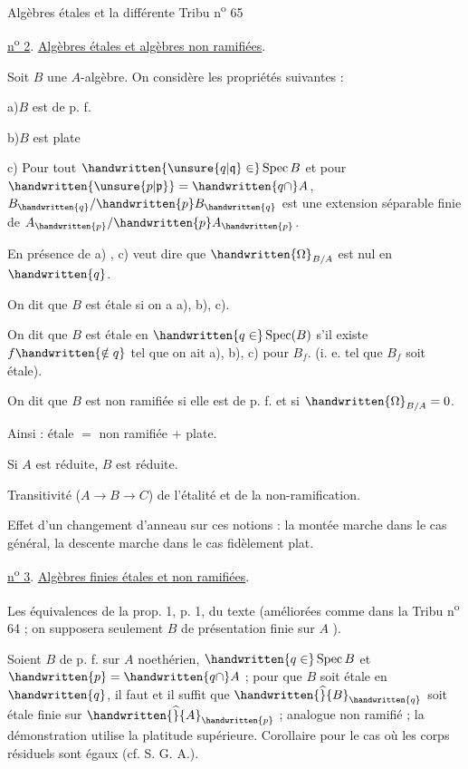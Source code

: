 Algèbres étales et la différente \hfill Tribu n\textsuperscript{o} 65

\uline{n\textsuperscript{o} 2}. \uline{Algèbres étales et algèbres non ramifiées}.

Soit $B$ une $A$-algèbre. On considère les propriétés suivantes :

a)\quad $B$ est de p. f.

b)\quad $B$ est plate

c) Pour tout $\handwritten{\unsure{q|\mathfrak{q}}\in}\operatorname{Spec} B$ et pour $\handwritten{\unsure{p|\mathfrak{p}}}= \handwritten{q\cap}A$, $B_{\handwritten{q}}/\handwritten{p}B_{\handwritten{q}}$ est une extension
séparable finie de $A_{\handwritten{p}}/\handwritten{p}A_{\handwritten{p}}$.

En présence de a) , c) veut dire que $\handwritten{\Omega}_{B/A}$ est nul en $\handwritten{q}$.

On dit que $B$ est étale si on a a), b), c).

On dit que $B$ est étale en $\handwritten{q\in}\operatorname{Spec}(B)$ s'il existe $f\handwritten{\notin q}$ tel que on ait a),
b), c) pour $B_f$. (i. e. tel que $B_f$ soit étale).

On dit que $B$ est non ramifiée si elle est de p. f. et si $\handwritten{\Omega}_{B/A}=0$.

Ainsi : étale $=$ non ramifiée $+$ plate.

Si $A$ est réduite, $B$ est réduite.

Transitivité ($A\longrightarrow B\longrightarrow C$) de l'étalité et de la non-ramification.

Effet d'un changement d'anneau sur ces notions : la montée marche dans le cas
général, la descente marche dans le cas fidèlement plat.

\uline{n\textsuperscript{o} 3}. \uline{Algèbres finies étales et non ramifiées}.

Les équivalences de la prop. 1, p. 1, du texte (améliorées comme dans la Tribu
n\textsuperscript{o} 64 ; on supposera seulement $B$ de présentation finie sur $A$ ).

Soient $B$ de p. f. sur $A$ noethérien, $\handwritten{q\in}\operatorname{Spec} B$ et $\handwritten{p}=\handwritten{q\cap} A$ ; pour
que $B$ soit étale en $\handwritten{q}$, il faut et il suffit que $\handwritten{\widehat}{B}_{\handwritten{q}}$ soit étale finie sur
$\handwritten{\widehat}{A}_{\handwritten{p}}$ ; analogue non ramifié ; la démonstration utilise la platitude supérieure. Corollaire pour le cas où les corps résiduels sont égaux (cf. S. G. A.).


